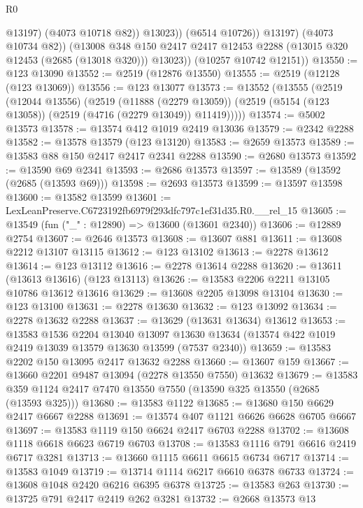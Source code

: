 \begin{lexlean}{R0}
\begin{coremodule}
                      @13197)
                    (@4073 @10718 @82))
                  @13023))
              (@6514 @10726))
            @13197)
          (@4073 @10734 @82))
        (@13008
          @348
          @150
          @2417
          @2417
          @12453
          @2288
          (@13015 @320 @12453 (@2685 (@13018 @320)))
          @13023))
      (@10257 @10742 @12151))
@13550 := @123 @13090
@13552 := @2519 (@12876 @13550)
@13555 := @2519 (@12128 (@123 @13069))
@13556 := @123 @13077
@13573 := @13552
    (@13555
      (@2519
        (@12044 @13556)
        (@2519
          (@11888 (@2279 @13059))
          (@2519 (@5154 (@123 @13058)) (@2519 (@4716 (@2279 @13049)) @11419)))))
@13574 := @5002 @13573
@13578 := @13574 @412 @1019 @2419 @13036
@13579 := @2342 @2288
@13582 := @13578 @13579 (@123 @13120)
@13583 := @2659 @13573
@13589 := @13583 @88 @150 @2417 @2417 @2341 @2288
@13590 := @2680 @13573
@13592 := @13590 @69 @2341
@13593 := @2686 @13573
@13597 := @13589 (@13592 (@2685 (@13593 @69)))
@13598 := @2693 @13573
@13599 := @13597 @13598
@13600 := @13582 @13599
@13601 := LexLeanPreserve.C6723192fb6979f293dfc797c1ef31d35.R0.__rel_15
@13605 := @13549 (fun ("_" : @12890) => @13600 (@13601 @2340))
@13606 := @12889 @2754
@13607 := @2646 @13573
@13608 := @13607 @881
@13611 := @13608 @2212 @13107 @13115
@13612 := @123 @13102
@13613 := @2278 @13612
@13614 := @123 @13112
@13616 := @2278 @13614 @2288
@13620 := @13611 (@13613 @13616) (@123 @13113)
@13626 := @13583 @2206 @2211 @13105 @10786 @13612 @13616
@13629 := @13608 @2205 @13098 @13104
@13630 := @123 @13100
@13631 := @2278 @13630
@13632 := @123 @13092
@13634 := @2278 @13632 @2288
@13637 := @13629 (@13631 @13634) @13612
@13653 := @13583
    @1536
    @2204
    @13040
    @13097
    @13630
    @13634
    (@13574 @422 @1019 @2419 @13039 @13579 @13630 @13599 (@7537 @2340))
@13659 := @13583 @2202 @150 @13095 @2417 @13632 @2288
@13660 := @13607 @159
@13667 := @13660 @2201 @9487 @13094 (@2278 @13550 @7550) @13632
@13679 := @13583 @359 @1124 @2417 @7470 @13550 @7550 (@13590 @325 @13550 (@2685 (@13593 @325)))
@13680 := @13583 @1122
@13685 := @13680 @150 @6629 @2417 @6667 @2288
@13691 := @13574 @407 @1121 @6626 @6628 @6705 @6667
@13697 := @13583 @1119 @150 @6624 @2417 @6703 @2288
@13702 := @13608 @1118 @6618 @6623 @6719 @6703
@13708 := @13583 @1116 @791 @6616 @2419 @6717 @3281
@13713 := @13660 @1115 @6611 @6615 @6734 @6717
@13714 := @13583 @1049
@13719 := @13714 @1114 @6217 @6610 @6378 @6733
@13724 := @13608 @1048 @2420 @6216 @6395 @6378
@13725 := @13583 @263
@13730 := @13725 @791 @2417 @2419 @262 @3281
@13732 := @2668 @13573 @13

\end{coremodule}
\end{lexlean}

